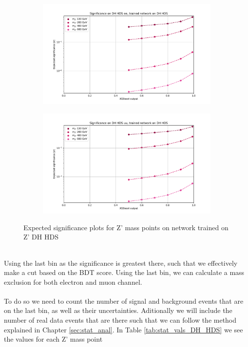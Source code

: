 \documentclass[12pt, a4paper]{book}
\begin{document}
\begin{figure}[!ht]
	\centering
	\begin{subfigure}[b]{0.49\textwidth}
      \centering
      \includegraphics[width=1\textwidth]{XGBoost/DH_HDS/EXP_SIG_ee.pdf}
      \end{subfigure}
   \hfill
   \begin{subfigure}[b]{0.49\textwidth}
      \centering
      \includegraphics[width=1\textwidth]{XGBoost/DH_HDS/EXP_SIG_uu.pdf}
      \end{subfigure}
   \caption{Expected significance plots for Z' mass points on network trained on Z' DH HDS}\label{fig:DH_HDS_exp_sig}
\end{figure}
\\Using the last bin as the significance is greatest there, such that we effectively make a cut based on the BDT score. Using the last bin, we can calculate a mass exclusion for both electron and muon channel.\\
\\To do so we need to count the number of signal and background events that are on the last bin, as well as their uncertainties. Aditionally we will include the number of real data events that are there such that we can follow the 
method explained in Chapter \ref{sec:stat_anal}. In Table \ref{tab:stat_vals_DH_HDS} we see the values for each Z' mass point
\end{document}
